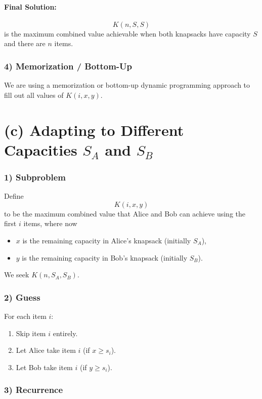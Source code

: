 \documentclass[11pt]{article}
\begin{document}
    \paragraph{Final Solution:}
    \[
    K(n, S, S)
    \]
    is the maximum combined value achievable when both knapsacks have capacity \(S\) and there are \(n\) items.
    
    \subsubsection*{4) Memorization / Bottom-Up}
    We are using a memorization or bottom-up dynamic programming approach to fill out all values of \(K(i,x,y)\).
    
    \bigskip
    
    \section*{(c) Adapting to Different Capacities \(S_A\) and \(S_B\)}
    
    \subsubsection*{1) Subproblem}
    Define
    \[
    K(i, x, y)
    \]
    to be the maximum combined value that Alice and Bob can achieve using the first \(i\) items, where now
    \begin{itemize}
        \item \(x\) is the remaining capacity in Alice's knapsack (initially \(S_A\)),
        \item \(y\) is the remaining capacity in Bob's knapsack (initially \(S_B\)).
    \end{itemize}
    We seek \(K(n, S_A, S_B)\).
    
    \subsubsection*{2) Guess}
    For each item \(i\):
    \begin{enumerate}
        \item Skip item \(i\) entirely.
        \item Let Alice take item \(i\) (if \(x \ge s_i\)).
        \item Let Bob take item \(i\) (if \(y \ge s_i\)).
    \end{enumerate}
    
    \subsubsection*{3) Recurrence}
\end{document}
